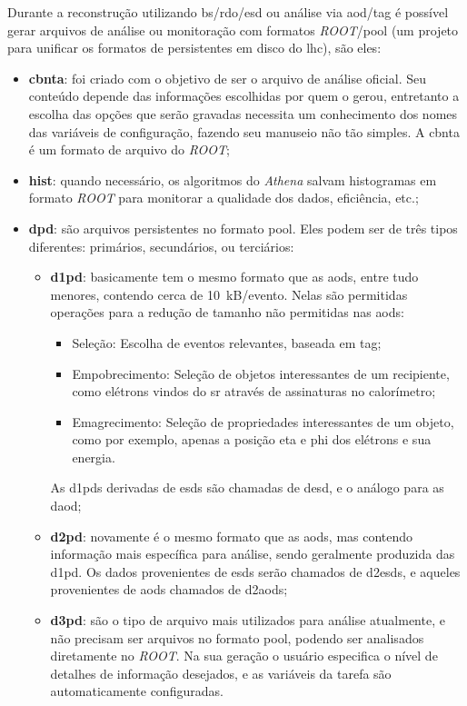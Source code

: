 Durante a reconstrução utilizando \gls{bs}/\gls{rdo}/\gls{esd} ou análise via
\gls{aod}/\gls{tag} é possível gerar arquivos de análise ou monitoração com formatos 
\emph{ROOT}/\gls{pool} (um projeto para unificar os formatos de
persistentes em disco do \gls{lhc}), são eles:


\begin{itemize}
\item \textbf{\gls{cbnta}}: foi criado com o objetivo de ser o arquivo de
análise oficial. Seu conteúdo depende das informações escolhidas por quem o
gerou, entretanto a escolha das opções que serão gravadas necessita um
conhecimento dos nomes das variáveis de configuração, fazendo seu manuseio não
tão simples. A \gls{cbnta} é um formato de arquivo do \emph{ROOT};
\item \textbf{\gls{hist}}: quando necessário, os algoritmos do \emph{Athena} salvam
histogramas em formato \emph{ROOT} para monitorar a qualidade dos dados, eficiência, etc.;
\item \textbf{\gls{dpd}}: são arquivos persistentes no formato \gls{pool}. Eles
podem ser de três tipos diferentes: primários, secundários, ou terciários:
\begin{itemize}
\item \textbf{\gls{d1pd}}: basicamente tem o mesmo formato que as \glspl{aod},
entre tudo menores, contendo cerca de 10~kB/evento. Nelas são permitidas operações para
a redução de tamanho não permitidas nas \glspl{aod}:
\begin{itemize}
\item Seleção: Escolha de eventos relevantes, baseada em \gls{tag};
\item Empobrecimento: Seleção de objetos interessantes de um recipiente,
como elétrons vindos do \glsdesc{sr} através de assinaturas no
calorímetro;
\item Emagrecimento: Seleção de propriedades interessantes de um objeto, como
por exemplo, apenas a posição \gls{eta} e \gls{phi} dos elétrons e sua energia.
\end{itemize}
As \glspl{d1pd} derivadas de \glspl{esd} são chamadas de \gls{desd}, e o
análogo para as \gls{daod};
\item \textbf{\gls{d2pd}}: novamente é o mesmo formato que as \glspl{aod}, mas
contendo informação mais específica para análise, sendo geralmente produzida das
\gls{d1pd}. Os dados provenientes de \glspl{esd} serão chamados de
\glspl{d2esd}, e aqueles provenientes de \glspl{aod} chamados de
\glspl{d2aod};
\item \textbf{\gls{d3pd}}: são o tipo de arquivo mais utilizados para análise
atualmente, e não precisam ser arquivos no formato \gls{pool}, podendo ser
analisados diretamente no \emph{ROOT}. Na sua geração o
usuário especifica o nível de detalhes de informação desejados, e as variáveis
da tarefa são automaticamente configuradas.
\end{itemize}
\end{itemize}

